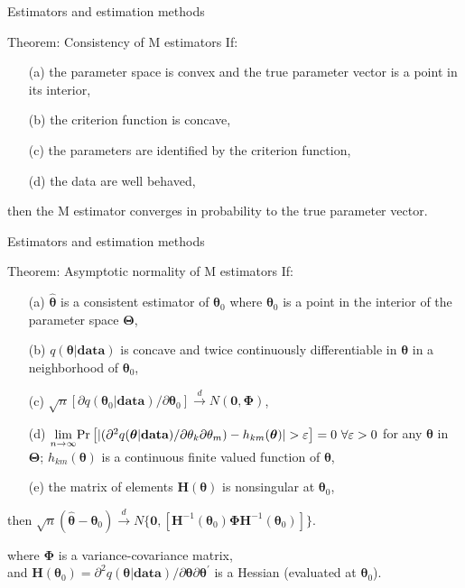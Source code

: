 \documentclass{beamer}
\begin{document}
\begin{frame}{Estimators and estimation methods}
\begin{block}{Theorem: Consistency of M estimators}
If: \\ \smallskip 
\begin{itemize}
    \item[(a)] the parameter space is convex and the true parameter vector is a point in its interior,
    \smallskip
    \item[(b)] the criterion function is concave,
    \smallskip
    \item[(c)] the parameters are identified by the criterion function,
    \smallskip
    \item[(d)] the data are well behaved,\\ \smallskip
\end{itemize}
then the M estimator converges in probability to the true parameter vector. 
\end{block}
\end{frame}
\begin{frame}{Estimators and estimation methods}
\small 
\begin{block}{Theorem: Asymptotic normality of M estimators}
If:
\begin{itemize}
    \item[(a)] $\hat{\bm{\theta}}$ is a consistent estimator of $\bm{\theta}_0$ where $\bm{\theta}_0$ is a point in the interior of the parameter space $\bm{\Theta}$,
    \smallskip 
    \item[(b)] $q(\bm{\theta}|\textbf{data})$ is concave and twice continuously differentiable in $\bm{\theta}$ in a neighborhood of $\bm{\theta}_0$,  
    \smallskip 
    \item[(c)] $\sqrt{n} \left[ \partial q(\bm{\theta}_0|\textbf{data})/ \partial \bm{\theta}_0 \right] \xrightarrow{~~d~~} N(\bm{0},\bm{\Phi})$,  
    \smallskip 
    \item[(d)] $\underset{n \rightarrow \infty}{\lim} \textnormal{Pr} \left[ |(\partial^2 q(\bm{\theta}|\textbf{data})/ \partial \theta_k \partial \theta_m)- h_{km}(\bm{\theta}) | >\varepsilon \right] = 0~ \forall \varepsilon > 0$ for any $\bm{\theta}$ in $\bm{\Theta}$; $h_{km}(\bm{\theta})$ is a continuous finite valued function of $\bm{\theta}$,
    \smallskip 
    \item[(e)] the matrix of elements $\bm{H}(\bm{\theta})$ is nonsingular at $\bm{\theta}_0$,
\end{itemize}
\smallskip then $\sqrt{n} (\hat{\bm{\theta}} - \bm{\theta}_0) \xrightarrow{~~d~~} N \lbrace \bm{0},[ \bm{H}^{-1}(\bm{\theta}_0)\bm{\Phi}\bm{H}^{-1}(\bm{\theta}_0)] \rbrace$. 
\end{block}
where $\bm{\Phi}$ is a variance-covariance matrix,   \\and $\bm{H}(\bm{\theta}_0)=\partial^2 q(\bm{\theta}|\textbf{data})/ \partial \bm{\theta} \partial \bm{\theta}^{\prime}$ is a Hessian (evaluated at $\bm{\theta}_0$).
\end{frame}
\end{document}
